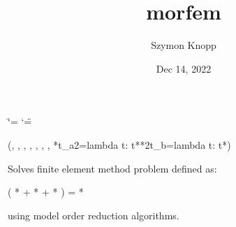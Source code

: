 \documentclass[letterpaper,10pt,english]{sphinxmanual}
\title{morfem}
\date{Dec 14, 2022}
\author{Szymon Knopp}
\begin{document}
\ifdefined\shorthandoff
  \ifnum\catcode`\=\string=\active\shorthandoff{=}\fi
  \ifnum\catcode`\"=\active{}\fi
\fi

\pagestyle{empty}
\sphinxmaketitle
\pagestyle{plain}
\sphinxtableofcontents
\pagestyle{normal}
\label{\detokenize{index::doc}}\label{\detokenize{index:morfem}}
\sphinxAtStartPar
{}(, , , , , ,
, *t\_a2=lambda t: t**2\sphinxstyleemphasis{,}t\_b=lambda t: t*)

\begin{DUlineblock}{0em}
\item[] Solves finite element method problem defined as:
\item[] ( *  +  *  +  * )  =  * 
\item[] using model order reduction algorithms.
\end{DUlineblock}
\end{document}
